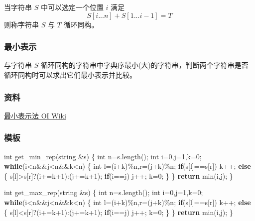 \documentclass[
]{article}
\newenvironment{Shaded}{}{}
\newcommand{\ControlFlowTok}[1]{\textcolor[rgb]{0.00,0.44,0.13}{\textbf{#1}}}
\newcommand{\DataTypeTok}[1]{\textcolor[rgb]{0.56,0.13,0.00}{#1}}
\newcommand{\DecValTok}[1]{\textcolor[rgb]{0.25,0.63,0.44}{#1}}
\newcommand{\NormalTok}[1]{#1}
\begin{document}
当字符串 \(S\) 中可以选定一个位置 \(i\) 满足
\[ S[i...n] + S[1...i-1] = T \] 则称字符串 \(S\) 与 \(T\) 循环同构。

\hypertarget{ux6700ux5c0fux8868ux793a}{%
\subsubsection{最小表示}\label{ux6700ux5c0fux8868ux793a}}

与字符串 \(S\)
循环同构的字符串中字典序最小(大)的字符串，判断两个字符串是否循环同构时可以求出它们最小表示并比较。

\hypertarget{ux8d44ux6599-4}{%
\subsubsection{资料}\label{ux8d44ux6599-4}}

\href{https://oi-wiki.org/string/minimal-string/\#simple}{最小表示法 OI
Wiki}

\hypertarget{ux6a21ux677f-5}{%
\subsubsection{模板}\label{ux6a21ux677f-5}}

\begin{Shaded}
\begin{Highlighting}[]
\DataTypeTok{int}\NormalTok{ get\_min\_rep(string \&s)}
\NormalTok{\{}
    \DataTypeTok{int}\NormalTok{ n=s.length();}
    \DataTypeTok{int}\NormalTok{ i=}\DecValTok{0}\NormalTok{,j=}\DecValTok{1}\NormalTok{,k=}\DecValTok{0}\NormalTok{;}
    \ControlFlowTok{while}\NormalTok{(i\textless{}n\&\&j\textless{}n\&\&k\textless{}n)}
\NormalTok{    \{}
        \DataTypeTok{int}\NormalTok{ l=(i+k)\%n,r=(j+k)\%n;}
        \ControlFlowTok{if}\NormalTok{(s[l]==s[r]) k++;}
        \ControlFlowTok{else}
\NormalTok{        \{}
\NormalTok{            s[l]\textgreater{}s[r]?(i+=k+}\DecValTok{1}\NormalTok{):(j+=k+}\DecValTok{1}\NormalTok{);}
            \ControlFlowTok{if}\NormalTok{(i==j) j++;}
\NormalTok{            k=}\DecValTok{0}\NormalTok{;}
\NormalTok{        \}}
\NormalTok{    \}}
    \ControlFlowTok{return}\NormalTok{ min(i,j);}
\NormalTok{\}}

\DataTypeTok{int}\NormalTok{ get\_max\_rep(string \&s)}
\NormalTok{\{}
    \DataTypeTok{int}\NormalTok{ n=s.length();}
    \DataTypeTok{int}\NormalTok{ i=}\DecValTok{0}\NormalTok{,j=}\DecValTok{1}\NormalTok{,k=}\DecValTok{0}\NormalTok{;}
    \ControlFlowTok{while}\NormalTok{(i\textless{}n\&\&j\textless{}n\&\&k\textless{}n)}
\NormalTok{    \{}
        \DataTypeTok{int}\NormalTok{ l=(i+k)\%n,r=(j+k)\%n;}
        \ControlFlowTok{if}\NormalTok{(s[l]==s[r]) k++;}
        \ControlFlowTok{else}
\NormalTok{        \{}
\NormalTok{            s[l]\textless{}s[r]?(i+=k+}\DecValTok{1}\NormalTok{):(j+=k+}\DecValTok{1}\NormalTok{);}
            \ControlFlowTok{if}\NormalTok{(i==j) j++;}
\NormalTok{            k=}\DecValTok{0}\NormalTok{;}
\NormalTok{        \}}
\NormalTok{    \}}
    \ControlFlowTok{return}\NormalTok{ min(i,j);}
\NormalTok{\}}
\end{Highlighting}
\end{Shaded}
\end{document}
